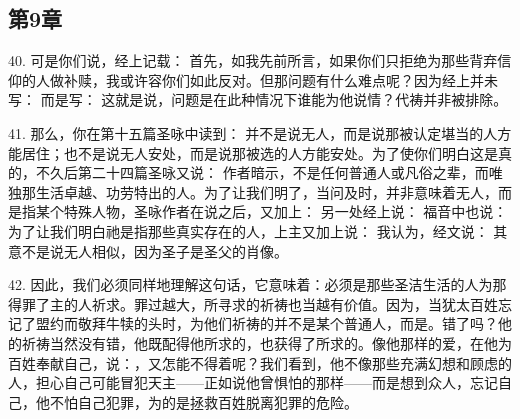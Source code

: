 \subsection{第9章}

\par

40. 可是你们说，经上记载： 首先，如我先前所言，如果你们只拒绝为那些背弃信仰的人做补赎，我或许容你们如此反对。但那问题有什么难点呢？因为经上并未写： 而是写： 这就是说，问题是在此种情况下谁能为他说情？代祷并非被排除。\par

41. 那么，你在第十五篇圣咏中读到： 并不是说无人，而是说那被认定堪当的人方能居住；也不是说无人安处，而是说那被选的人方能安处。为了使你们明白这是真的，不久后第二十四篇圣咏又说： 作者暗示，不是任何普通人或凡俗之辈，而唯独那生活卓越、功劳特出的人。为了让我们明了，当问及时，并非意味着无人，而是指某个特殊人物，圣咏作者在说之后，又加上： 另一处经上说： 福音中也说： 为了让我们明白祂是指那些真实存在的人，上主又加上说： 我认为，经文说： 其意不是说无人相似，因为圣子是圣父的肖像。\par

42. 因此，我们必须同样地理解这句话，它意味着：必须是那些圣洁生活的人为那得罪了主的人祈求。罪过越大，所寻求的祈祷也当越有价值。因为，当犹太百姓忘记了盟约而敬拜牛犊的头时，为他们祈祷的并不是某个普通人，而是。错了吗？他的祈祷当然没有错，他既配得他所求的，也获得了所求的。像他那样的爱，在他为百姓奉献自己，说：，又怎能不得着呢？我们看到，他不像那些充满幻想和顾虑的人，担心自己可能冒犯天主——正如说他曾惧怕的那样——而是想到众人，忘记自己，他不怕自己犯罪，为的是拯救百姓脱离犯罪的危险。\par

